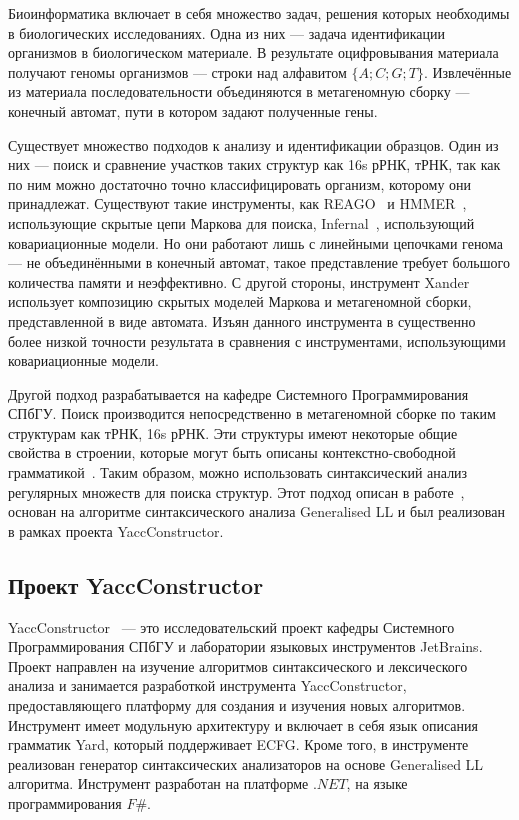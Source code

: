 \documentclass[12pt]{matmex-diploma-custom}
\begin{document}
    Биоинформатика включает в себя множество задач, решения которых необходимы в биологических исследованиях.
    Одна из них --- задача идентификации организмов в биологическом материале. В результате оцифровывания материала получают
    геномы организмов --- строки над алфавитом $\{A;C; G; T\}$.
    Извлечённые из материала последовательности объединяются в метагеномную сборку --- конечный автомат, пути в котором задают полученные 
    гены.
    
    Существует множество подходов к анализу и идентификации образцов. Один из них --- поиск и сравнение участков таких структур как
    16s рРНК, тРНК, так как по ним можно достаточно точно классифицировать организм, которому они принадлежат.
    Существуют такие инструменты, как REAGO~\cite{reago} и HMMER~\cite{hmmer}, использующие скрытые цепи Маркова для поиска, 
    Infernal~\cite{Infernal}, использующий ковариационные модели. Но они работают лишь с линейными цепочками генома ---
    не объединёнными в конечный автомат,
    такое представление требует большого количества памяти и неэффективно. С другой стороны, инструмент Xander~\cite{xander} использует 
    композицию скрытых моделей Маркова и метагеномной сборки, представленной в виде автомата. Изъян данного инструмента в существенно 
    более низкой точности результата в сравнения с инструментами, использующими ковариационные модели.
    
    Другой подход разрабатывается на кафедре Системного Программирования СПбГУ.
    Поиск производится непосредственно в метагеномной сборке по таким структурам как тРНК, 16s рРНК.
    Эти структуры имеют некоторые общие свойства в строении, которые могут быть описаны
    контекстно-свободной грамматикой~\cite{Anderson2013}.
    Таким образом, можно использовать синтаксический анализ регулярных множеств для поиска структур.
	Этот подход описан в работе~\cite{ragozina}, основан на алгоритме синтаксического анализа Generalised LL и 
    был реализован в рамках проекта YaccConstructor.
	
    \subsection{Проект YaccConstructor}
    YaccConstructor~\cite{YaccConstructor} --- это исследовательский проект кафедры Системного Программирования СПбГУ и лаборатории
    языковых инструментов JetBrains. Проект направлен на изучение алгоритмов синтаксического и 
    лексического анализа и занимается разработкой инструмента YaccConstructor, предоставляющего платформу для
    создания и изучения новых алгоритмов. Инструмент имеет модульную архитектуру и включает в себя язык описания 
    грамматик Yard, который поддерживает ECFG. Кроме того, в инструменте 
    реализован генератор синтаксических анализаторов на основе Generalised LL алгоритма.
    Инструмент разработан на платформе $.NET$, на языке программирования $F\#$.
    
\end{document}
